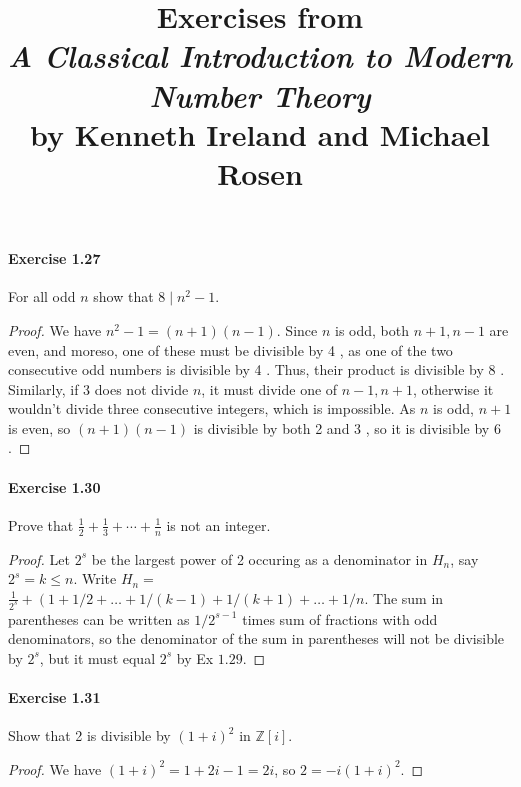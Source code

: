 \documentclass{article}
\title{\textbf{
Exercises from \\
\textit{A Classical Introduction to Modern Number Theory} \\
by Kenneth Ireland and Michael Rosen
}}
\date{}
\begin{document}
\maketitle


\paragraph{Exercise 1.27} For all odd $n$ show that $8 \mid n^{2}-1$.
\begin{proof}
    We have $n^2-1=(n+1)(n-1)$. Since $n$ is odd, both $n+1, n-1$ are even, and moreso, one of these must be divisible by 4 , as one of the two consecutive odd numbers is divisible by 4 . Thus, their product is divisible by 8 . Similarly, if 3 does not divide $n$, it must divide one of $n-1, n+1$, otherwise it wouldn't divide three consecutive integers, which is impossible. As $n$ is odd, $n+1$ is even, so $(n+1)(n-1)$ is divisible by both 2 and 3 , so it is divisible by 6 .
\end{proof}



\paragraph{Exercise 1.30} Prove that $\frac{1}{2}+\frac{1}{3}+\cdots+\frac{1}{n}$ is not an integer.
\begin{proof}
Let $2^s$ be the largest power of 2 occuring as a denominator in $H_n$, say $2^s=k \leqslant n$. Write $H_n=$ $\frac{1}{2^s}+\left(1+1 / 2+\ldots+1 /(k-1)+1 /(k+1)+\ldots+1 / n\right.$. The sum in parentheses can be written as $1 / 2^{s-1}$ times sum of fractions with odd denominators, so the denominator of the sum in parentheses will not be divisible by $2^s$, but it must equal $2^s$ by Ex $1.29$.
\end{proof}



\paragraph{Exercise 1.31} Show that 2 is divisible by $(1+i)^{2}$ in $\mathbb{Z}[i]$.
\begin{proof}
We have $(1+i)^2=1+2 i-1=2 i$, so $2=-i(1+i)^2$.
\end{proof}
\end{document}
